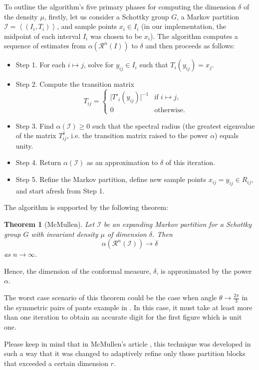 \documentclass[12pt,oneside]{sfsuthesis}
\theoremstyle{plain} %
\newtheorem{theorem}{Theorem}[chapter]
\theoremstyle{definition}  %
\theoremstyle{remark}  %
\theoremstyle{plain}
\begin{document}
{To outline the algorithm's five primary phases for computing the dimension $\delta$ of the density $\mu$, firstly, let us consider a Schottky group $G$, a Markov partition $\mathcal{I}=\left\langle (I_i,T_i)\right\rangle$, and sample points $x_i\in I_i$ (in our implementation, the midpoint of each interval $I_i$ was chosen to be $x_i$). The algorithm computes a sequence of estimates from $\alpha\left( \mathcal{R}^n(I)\right)$ to $\delta$ and then proceeds as follows:
\begin{itemize}
\item Step 1. For each $i\mapsto j$, solve for $y_{ij}\in I_i$ such that $T_i(y_{ij})=x_j$.
\item Step 2. Compute the transition matrix
$$
T_{ij}=\begin{cases} 
      \vert T'_i(y_{ij}) \vert^{-1} & \text{if }i\mapsto j, \\
      0 & \text{otherwise.}
   \end{cases}
$$
\item Step 3. Find $\alpha(\mathcal{I})\geq 0$ such that the spectral radius (the greatest eigenvalue of the matrix $T_{ij}^\delta$, i.e. the transition matrix raised to the power $\alpha$) equals unity. 
\item Step 4. Return $\alpha(\mathcal{I})$ as an approximation to $\delta$ of this iteration.
\item Step 5. Refine the Markov partition, define new sample points $x_{ij}=y_{ij}\in R_{ij}$, and start afresh from Step 1.
\end{itemize}
The algorithm is supported by the following theorem\cite{mcmullen1998hausdorff}:
\begin{theorem}[McMullen]
Let $\mathcal{I}$ be an expanding Markov partition for a Schottky group $G$ with invariant density $\mu$ of dimension $\delta$. Then
$$
\alpha(\mathcal{R}^n(\mathcal{I}))\to \delta
$$
as $n\to \infty$. 
\end{theorem}
Hence, the dimension of the conformal measure, $\delta$, is approximated by the power $\alpha$.

The worst case scenario of this theorem could be the case when angle $\theta\to \frac{2\pi}{3}$ in the symmetric pairs of pants example in \cite{mcmullen1998hausdorff}. In this case, it must take at least more than one iteration to obtain an accurate digit for the first figure which is unit one.


Please keep in mind that in McMullen's article \cite{mcmullen1998hausdorff}, this technique was developed in such a way that it was changed to adaptively refine only those partition blocks that exceeded a certain dimension $r$.

}
\end{document}
